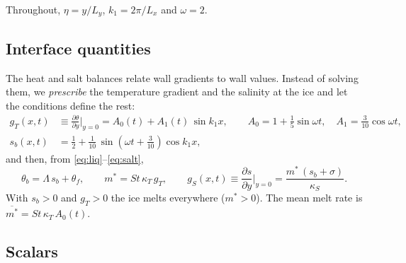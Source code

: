 \documentclass[11pt,a4paper]{article}
\newcommand{\pd}[2]{\frac{\partial #1}{\partial #2}}
\begin{document}
Throughout, $\eta=y/L_y$, $k_1=2\pi/L_x$ and $\omega=2$.

\subsection{Interface quantities}

The heat and salt balances relate wall gradients to wall values. Instead of solving them, we
\emph{prescribe} the temperature gradient and the salinity at the ice and let the conditions define the
rest:
\begin{align}
  g_T(x,t) &\equiv \pd{\theta}{y}\Big|_{y=0} = A_0(t) + A_1(t)\,\sin k_1 x,
     \qquad A_0 = 1 + \tfrac15\sin\omega t,\quad A_1 = \tfrac{3}{10}\cos\omega t, \\
  s_b(x,t) &= \tfrac12 + \tfrac1{10}\,\sin\!\left(\omega t + \tfrac{3}{10}\right)\cos k_1 x,
\end{align}
and then, from \eqref{eq:liq}--\eqref{eq:salt},
\begin{equation}
  \theta_b = \Lambda\,s_b + \theta_f, \qquad
  m^* = St\,\kappa_T\, g_T, \qquad
  g_S(x,t) \equiv \pd{s}{y}\Big|_{y=0} = \frac{m^*\,(s_b+\sigma)}{\kappa_S}.
  \label{eq:interface}
\end{equation}
With $s_b>0$ and $g_T>0$ the ice melts everywhere ($m^*>0$). The mean melt rate is
$\overline{m^*} = St\,\kappa_T\,A_0(t)$.

\subsection{Scalars}
\end{document}

